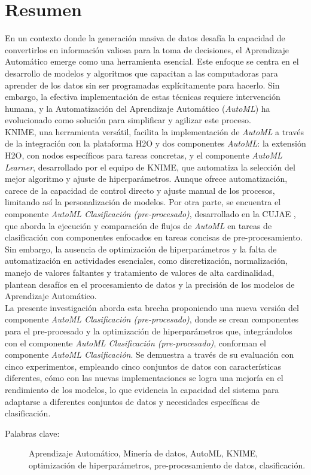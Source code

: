 \section*{Resumen}
En un contexto donde la generación masiva de datos desafía la capacidad de convertirlos en información valiosa para la toma de decisiones, el Aprendizaje Automático emerge como una herramienta esencial. Este enfoque se centra en el desarrollo de modelos y algoritmos que capacitan a las computadoras para aprender de los datos sin ser programadas explícitamente para hacerlo. Sin embargo, la efectiva implementación de estas técnicas requiere intervención humana, y la Automatización del Aprendizaje Automático (\textit{AutoML}) ha evolucionado como solución para simplificar y agilizar este proceso. \\
KNIME, una herramienta versátil, facilita la implementación de \textit{AutoML} a través de la integración con la plataforma H2O y dos componentes \textit{AutoML}: la extensión H2O, con nodos específicos para tareas concretas, y el componente \textit{AutoML Learner}, desarrollado por el equipo de KNIME, que automatiza la selección del mejor algoritmo y ajuste de hiperparámetros. Aunque ofrece automatización, carece de la capacidad de control directo y ajuste manual de los procesos, limitando así la personalización de modelos. Por otra parte, se encuentra el componente \textit{AutoML Clasificación (pre-procesado)}, desarrollado en la CUJAE \citep{Carrazana2022}, que aborda la ejecución y comparación de flujos de \textit{AutoML} en tareas de clasificación con componentes enfocados en tareas concisas de pre-procesamiento. Sin embargo, la ausencia de optimización de hiperparámetros y la falta de automatización en actividades esenciales, como discretización, normalización, manejo de valores faltantes y tratamiento de valores de alta cardinalidad, plantean desafíos en el procesamiento de datos y la precisión de los modelos de Aprendizaje Automático. \\
La presente investigación aborda esta brecha proponiendo una nueva versión del componente \textit{AutoML Clasificación (pre-procesado)}, donde se crean componentes para el pre-procesado y la optimización de hiperparámetros que, integrándolos con el componente \textit{AutoML Clasificación (pre-procesado)}, conforman el componente \textit{AutoML Clasificación}. Se demuestra a través de su evaluación con cinco experimentos, empleando cinco conjuntos de datos con características diferentes, cómo con las nuevas implementaciones se logra una mejoría en el rendimiento de los modelos, lo que evidencia la capacidad del sistema para adaptarse a diferentes conjuntos de datos y necesidades específicas de clasificación.
 

\begin{description}
	\item[Palabras clave:]{Aprendizaje Automático, Minería de datos, AutoML, KNIME, optimización de hiperparámetros, pre-procesamiento de datos, clasificación.}
\end{description}


